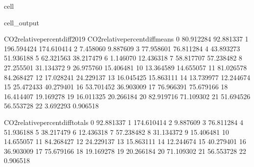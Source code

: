 \documentclass[letterpaper,10pt,english]{jupyterBook}
\begin{document}
\begin{sphinxuseclass}{cell}
\begin{sphinxVerbatimOutput}
\begin{sphinxuseclass}{cell_output}
\begin{sphinxVerbatim}[commandchars=\\\{\}]
    CO2\PYGZus{}relative\PYGZus{}percent\PYGZus{}diff\PYGZus{}2019  CO2\PYGZus{}relative\PYGZus{}percent\PYGZus{}diff\PYGZus{}means  \PYGZbs{}
0                       \PYGZhy{}80.912284                       \PYGZhy{}92.881337   
1                      \PYGZhy{}196.594424                      \PYGZhy{}174.610414   
2                        \PYGZhy{}7.458060                        \PYGZhy{}9.887609   
3                        77.958601                        76.811284   
4                        43.893273                        51.936188   
5                       \PYGZhy{}62.321563                       \PYGZhy{}38.217479   
6                         1.146070                        12.436318   
7                        58.817707                        57.238482   
8                        27.255501                        31.134372   
9                       \PYGZhy{}26.975760                       \PYGZhy{}15.406481   
10                       13.364589                        14.655057   
11                       81.026578                        84.268427   
12                       17.028241                        24.229137   
13                      \PYGZhy{}16.045425                       \PYGZhy{}15.863111   
14                       13.739977                        12.244674   
15                       25.472433                        40.279401   
16                      \PYGZhy{}53.701452                       \PYGZhy{}36.903009   
17                       76.966391                        75.679166   
18                      \PYGZhy{}16.414407                       \PYGZhy{}19.169278   
19                       16.011325                        20.266184   
20                      \PYGZhy{}82.919716                       \PYGZhy{}71.109302   
21                       51.694526                        56.553728   
22                        3.692293                        \PYGZhy{}0.906518   

    CO2\PYGZus{}relative\PYGZus{}percent\PYGZus{}diff\PYGZus{}totals  
0                         \PYGZhy{}92.881337  
1                        \PYGZhy{}174.610414  
2                          \PYGZhy{}9.887609  
3                          76.811284  
4                          51.936188  
5                         \PYGZhy{}38.217479  
6                          12.436318  
7                          57.238482  
8                          31.134372  
9                         \PYGZhy{}15.406481  
10                         14.655057  
11                         84.268427  
12                         24.229137  
13                        \PYGZhy{}15.863111  
14                         12.244674  
15                         40.279401  
16                        \PYGZhy{}36.903009  
17                         75.679166  
18                        \PYGZhy{}19.169278  
19                         20.266184  
20                        \PYGZhy{}71.109302  
21                         56.553728  
22                         \PYGZhy{}0.906518  


\end{sphinxVerbatim}
\end{sphinxuseclass}
\end{sphinxVerbatimOutput}
\end{sphinxuseclass}
\end{document}

